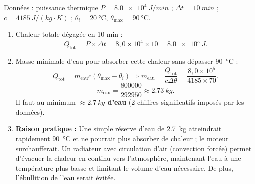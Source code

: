 \documentclass[11pt]{article}
\begin{document}
\begin{corrige}
Données : puissance thermique $P = \SI{8,0e4}{J/min}$ ; $\Delta t = \SI{10}{min}$ ; $c = \SI{4185}{J/(kg\cdot K)}$ ; $\theta_i = \SI{20}{\degreeCelsius}$, $\theta_{\text{max}} = \SI{90}{\degreeCelsius}$.
\begin{enumerate}
\item Chaleur totale dégagée en 10 min :
  \[
  Q_{\text{tot}} = P \times \Delta t = 8,0 \times 10^4 \times 10 = \SI{8,0e5}{J}.
  \]
\item Masse minimale d'eau pour absorber cette chaleur sans dépasser \SI{90}{\degreeCelsius} :
  \[
  Q_{\text{tot}} = m_{\text{eau}} c (\theta_{\text{max}} - \theta_i) \Rightarrow m_{\text{eau}} = \frac{Q_{\text{tot}}}{c \Delta\theta} = \frac{8,0 \times 10^5}{4185 \times 70}.
  \]
  \[
  m_{\text{eau}} = \frac{800000}{292950} \approx \SI{2,73}{kg}.
  \]
  Il faut au minimum \textbf{$\approx \SI{2,7}{kg}$ d'eau} (2 chiffres significatifs imposés par les données).
\item \textbf{Raison pratique :} Une simple réserve d'eau de \SI{2,7}{kg} atteindrait rapidement \SI{90}{\degreeCelsius} et ne pourrait plus absorber de chaleur ; le moteur surchaufferait. Un radiateur avec circulation d'air (convection forcée) permet d'évacuer la chaleur en continu vers l'atmosphère, maintenant l'eau à une température plus basse et limitant le volume d'eau nécessaire. De plus, l'ébullition de l'eau serait évitée.
\end{enumerate}
\end{corrige}
\end{document}
